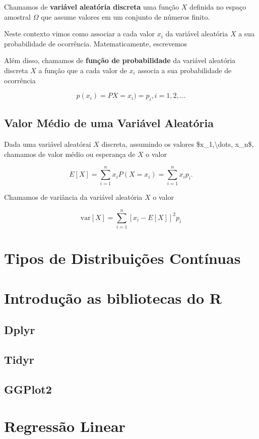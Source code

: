 \documentclass[
]{book}
\begin{document}
Chamamos de \textbf{variável aleatória discreta} uma função \(X\) definida no espaço amostral \(\Omega\) que assume valores em um conjunto de números finito.

Neste contexto vimos como associar a cada valor \(x_i\) da variável aleatória \(X\) a sua probabilidade de ocorrência. Matematicamente, escrevemos

Além disso, chamamos de \textbf{função de probabilidade} da variável aleatória discreta \(X\) a função que a cada valor de \(x_i\) associa a sua probabilidade de ocorrência

\[
p(x_i) = PX=x_i) = p_i, i =1, 2, \dots
\]

\hypertarget{valor-muxe9dio-de-uma-variuxe1vel-aleatuxf3ria}{%
\section{Valor Médio de uma Variável Aleatória}\label{valor-muxe9dio-de-uma-variuxe1vel-aleatuxf3ria}}

Dada uma variável aleatórai \(X\) discreta, assumindo os valores \$x\_1,\textbackslash dots, x\_n\$, chamamos de valor médio ou esperança de \(X\) o valor

\[
E[X] = \sum_{i=1}^n x_i P(X=x_i) = \sum_{i=1}^n x_i p_i.
\]

Chamamos de variância da variável aleatória \(X\) o valor

\[
\text{var}[X] = \sum_{i=1}^n [x_i - E[X]]^2 p_i
\]

\hypertarget{tipos-de-distribuiuxe7uxf5es-contuxednuas}{%
\chapter{Tipos de Distribuições Contínuas}\label{tipos-de-distribuiuxe7uxf5es-contuxednuas}}

\hypertarget{introduuxe7uxe3o-as-bibliotecas-do-r}{%
\chapter{Introdução as bibliotecas do R}\label{introduuxe7uxe3o-as-bibliotecas-do-r}}

\hypertarget{dplyr}{%
\section{Dplyr}\label{dplyr}}

\hypertarget{tidyr}{%
\section{Tidyr}\label{tidyr}}

\hypertarget{ggplot2}{%
\section{GGPlot2}\label{ggplot2}}

\hypertarget{regressuxe3o-linear}{%
\chapter{Regressão Linear}\label{regressuxe3o-linear}}

  
\end{document}
